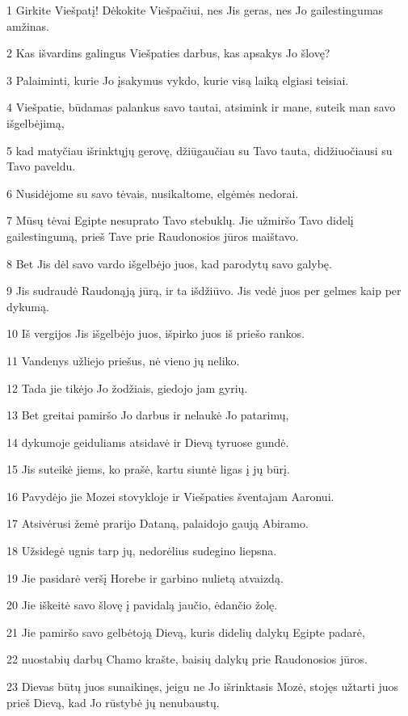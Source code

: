 \par 1 Girkite Viešpatį! Dėkokite Viešpačiui, nes Jis geras, nes Jo gailestingumas amžinas. 
\par 2 Kas išvardins galingus Viešpaties darbus, kas apsakys Jo šlovę? 
\par 3 Palaiminti, kurie Jo įsakymus vykdo, kurie visą laiką elgiasi teisiai. 
\par 4 Viešpatie, būdamas palankus savo tautai, atsimink ir mane, suteik man savo išgelbėjimą, 
\par 5 kad matyčiau išrinktųjų gerovę, džiūgaučiau su Tavo tauta, didžiuočiausi su Tavo paveldu. 
\par 6 Nusidėjome su savo tėvais, nusikaltome, elgėmės nedorai. 
\par 7 Mūsų tėvai Egipte nesuprato Tavo stebuklų. Jie užmiršo Tavo didelį gailestingumą, prieš Tave prie Raudonosios jūros maištavo. 
\par 8 Bet Jis dėl savo vardo išgelbėjo juos, kad parodytų savo galybę. 
\par 9 Jis sudraudė Raudonąją jūrą, ir ta išdžiūvo. Jis vedė juos per gelmes kaip per dykumą. 
\par 10 Iš vergijos Jis išgelbėjo juos, išpirko juos iš priešo rankos. 
\par 11 Vandenys užliejo priešus, nė vieno jų neliko. 
\par 12 Tada jie tikėjo Jo žodžiais, giedojo jam gyrių. 
\par 13 Bet greitai pamiršo Jo darbus ir nelaukė Jo patarimų, 
\par 14 dykumoje geiduliams atsidavė ir Dievą tyruose gundė. 
\par 15 Jis suteikė jiems, ko prašė, kartu siuntė ligas į jų būrį. 
\par 16 Pavydėjo jie Mozei stovykloje ir Viešpaties šventajam Aaronui. 
\par 17 Atsivėrusi žemė prarijo Dataną, palaidojo gaują Abiramo. 
\par 18 Užsidegė ugnis tarp jų, nedorėlius sudegino liepsna. 
\par 19 Jie pasidarė veršį Horebe ir garbino nulietą atvaizdą. 
\par 20 Jie iškeitė savo šlovę į pavidalą jaučio, ėdančio žolę. 
\par 21 Jie pamiršo savo gelbėtoją Dievą, kuris didelių dalykų Egipte padarė, 
\par 22 nuostabių darbų Chamo krašte, baisių dalykų prie Raudonosios jūros. 
\par 23 Dievas būtų juos sunaikinęs, jeigu ne Jo išrinktasis Mozė, stojęs užtarti juos prieš Dievą, kad Jo rūstybė jų nenubaustų. 
